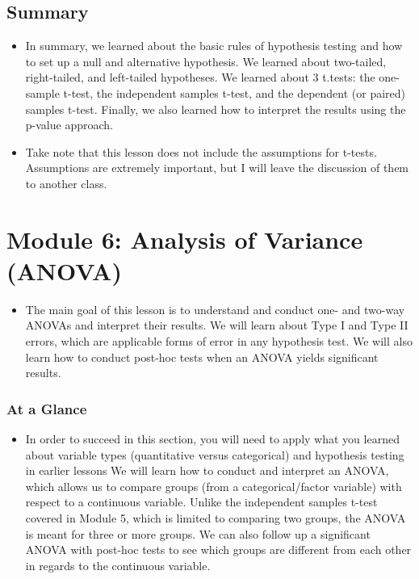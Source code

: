 \documentclass[
  letterpaper,
  DIV=11,
  numbers=noendperiod]{scrreprt}
\providecommand{\tightlist}{%
  \setlength{\itemsep}{0pt}\setlength{\parskip}{0pt}}\usepackage{longtable,booktabs,array}
\begin{document}
\section{Summary}\label{summary-5}

\begin{itemize}
\tightlist
\item
  In summary, we learned about the basic rules of hypothesis testing and
  how to set up a null and alternative hypothesis. We learned about
  two-tailed, right-tailed, and left-tailed hypotheses. We learned about
  3 t.tests: the one-sample t-test, the independent samples t-test, and
  the dependent (or paired) samples t-test. Finally, we also learned how
  to interpret the results using the p-value approach.
\item
  Take note that this lesson does not include the assumptions for
  t-tests. Assumptions are extremely important, but I will leave the
  discussion of them to another class.
\end{itemize}


\chapter{Module 6: Analysis of Variance
(ANOVA)}\label{module-6-analysis-of-variance-anova}

\begin{itemize}
\tightlist
\item
  The main goal of this lesson is to understand and conduct one- and
  two-way ANOVAs and interpret their results. We will learn about Type I
  and Type II errors, which are applicable forms of error in any
  hypothesis test. We will also learn how to conduct post-hoc tests when
  an ANOVA yields significant results.
\end{itemize}

\subsection{At a Glance}\label{at-a-glance-5}

\begin{itemize}
\tightlist
\item
  In order to succeed in this section, you will need to apply what you
  learned about variable types (quantitative versus categorical) and
  hypothesis testing in earlier lessons We will learn how to conduct and
  interpret an ANOVA, which allows us to compare groups (from a
  categorical/factor variable) with respect to a continuous variable.
  Unlike the independent samples t-test covered in Module 5, which is
  limited to comparing two groups, the ANOVA is meant for three or more
  groups. We can also follow up a significant ANOVA with post-hoc tests
  to see which groups are different from each other in regards to the
  continuous variable.
\end{itemize}
\end{document}
